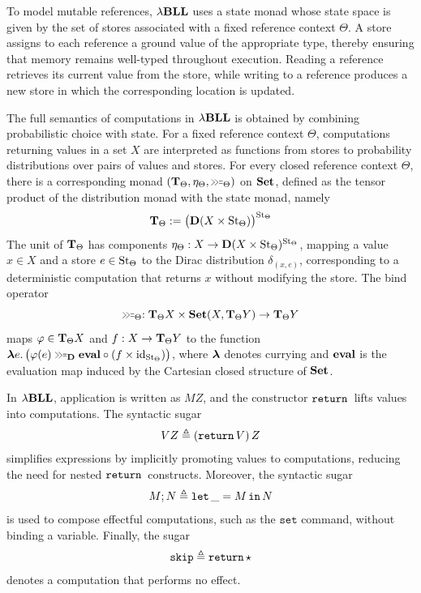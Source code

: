 To model mutable references, ${\lambda}\mathbf{BLL}$ uses a state monad whose state space is given by the set
of stores associated with a fixed reference context $\Theta$. A store assigns to each reference
a ground value of the appropriate type, thereby ensuring that memory remains well-typed
throughout execution. Reading a reference retrieves its current value from the store, while
writing to a reference produces a new store in which the corresponding location is updated.

The full semantics of computations in ${\lambda}\mathbf{BLL}$ is obtained by combining probabilistic choice with state. For a fixed reference context $\Theta$, computations returning values in a set $X$ are interpreted as functions from stores to probability distributions over pairs of values and stores. For every closed reference context $\Theta$, there is a corresponding monad $(\T_\Theta, \eta_\Theta, \bind_\Theta)$ on $\mathbf{Set}$, defined as the tensor product of the distribution monad with the state monad, namely
\[
\mathbf{T}_{\Theta} := \bigl(\mathbf{D}(X \times \mathrm{St}_{\Theta})\bigr)^{\mathrm{St}_{\Theta}}
\]
The unit of $\mathbf{T}_\Theta$ has components $\eta_\Theta : X \to \mathbf{D}(X \times \mathrm{St}_\Theta)^{\mathrm{St}_\Theta}$, mapping a value $x \in X$ and a store $e \in \mathrm{St}_\Theta$ to the Dirac distribution $\delta_{(x,e)}$, corresponding to a deterministic computation that returns $x$ without
modifying the store. The bind operator
\[
\bind_\Theta : \T_\Theta X \times \mathbf{Set}(X, \T_\Theta Y) \to \T_\Theta Y
\]
maps $\varphi \in \mathbf{T}_\Theta X$ and $f : X \to \mathbf{T}_\Theta Y$ to the function
$\dlambda e.\, \bigl(\varphi(e) \bind_\D \eval \circ (f \times \id_{\Store_\Theta})\bigr)$,
where $\boldsymbol{\lambda}$ denotes currying and $\mathbf{eval}$ is the evaluation map induced by the Cartesian closed structure of $\mathbf{Set}$.

In ${\lambda}\mathbf{BLL}$, application is written as $MZ$, and the constructor $\mathtt{return}\,$ lifts values into computations. The syntactic sugar
\begin{align}
VZ \triangleq (\mathtt{return}\, V)\,Z \label{eq:sugar-return}
\end{align}
simplifies expressions by implicitly promoting values to computations, reducing the need for nested $\mathtt{return}\,$ constructs. Moreover, the syntactic sugar
\begin{align}
M;N \triangleq \mathtt{let}\,\_ = M\,\mathtt{in}\, N \label{eq:sugar-letvoid}
\end{align}
is used to compose effectful computations, such as the $\mathtt{set}$ command, without binding a variable. Finally, the sugar
\begin{align}
\mathtt{skip} \triangleq \mathtt{return}\, \star \label{eq:sugar-skip}
\end{align}
denotes a computation that performs no effect.

